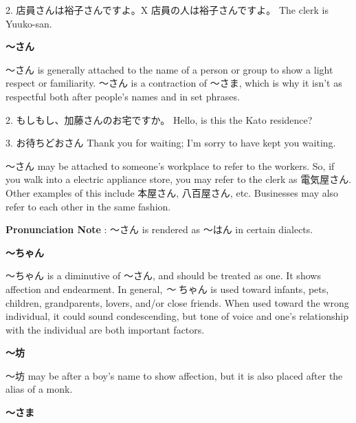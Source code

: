 \par{2. 店員さんは裕子さんですよ。X \hfill\break
店員の人は裕子さんですよ。 \hfill\break
The clerk is Yuuko-san. }

\begin{center}
 \textbf{～さん }
\end{center}

\par{ ～さん is generally attached to the name of a person or group to show a light respect or familiarity. ～さん is a contraction of ～さま, which is why it isn't as respectful both after people's names and in set phrases. }

\par{2. もしもし、加藤さんのお宅ですか。 \hfill\break
Hello, is this the Kato residence? }

\par{3. お待ちどおさん \hfill\break
Thank you for waiting; I'm sorry to have kept you waiting. }

\par{ ～さん may be attached to someone's workplace to refer to the workers. So, if you walk into a electric appliance store, you may refer to the clerk as 電気屋さん. Other examples of this include 本屋さん, 八百屋さん, etc. Businesses may also refer to each other in the same fashion. }

\par{\textbf{Pronunciation Note }: ～さん is rendered as ～はん in certain dialects. }

\begin{center}
\textbf{～ちゃん }
\end{center}

\par{～ちゃん is a diminutive of ～さん, and should be treated as one. It shows affection and endearment. In general, \emph{～ }ちゃん is used toward infants, pets, children, grandparents, lovers, and\slash or close friends. When used toward the wrong individual, it could sound condescending, but tone of voice and one's relationship with the individual are both important factors. }

\begin{center}
 \textbf{～坊 }
\end{center}

\par{～坊 may be after a boy's name to show affection, but it is also placed after the alias of a monk. }

\begin{center}
 \textbf{～さま }
\end{center}

